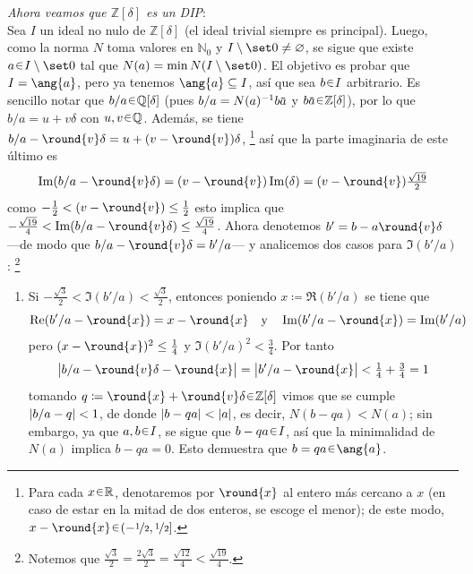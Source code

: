 \begin{sol}
\begin{enumerate}[label={\bfseries\Roman*}., wide, itemsep=1em]
\emph{Ahora veamos que $\mathbb{Z}[\delta]$ es un DIP}:\\
Sea $I$ un ideal no nulo de $\mathbb{Z}[\delta]$ (el ideal trivial siempre es principal). Luego, como la norma $N$ toma valores en $\mathbb{N}_0$ y $I\setminus\set0 \neq \varnothing$, se sigue que existe $a \en I\setminus\set0$ tal que $N(a) = \min N(I\setminus\set0)$. El objetivo es probar que $I = \ang{a}$, pero ya tenemos $\ang{a} \subseteq I$, así que sea $b \en I$ arbitrario. Es sencillo notar que $b/a \en \mathbb{Q}[\delta]$ (pues $b/a = N(a)^{-1}b\ubar{a}$ y $b\ubar{a}\en\mathbb{Z}[\delta]$), por lo que $b/a = u + v\delta$ con $u,v\en\mathbb{Q}$. Además, se tiene $b/a - \round{v}\delta = u + (v - \round{v})\delta$,%
\footnote{%
    Para cada $x \en \mathbb{R}$, denotaremos por $\round{x}$ al entero más cercano a $x$ (en caso de estar en la mitad de dos enteros, se escoge el menor); de este modo, $x - \round{x} \en (-\nicefrac12,\nicefrac12]$.
}
así que la parte imaginaria de este último es
\[
\Im(b/a - \round{v}\delta) = (v - \round{v})\Im(\delta) = (v - \round{v})\tfrac{\sqrt{19}}{2}
\]
como $-\frac12 < (v - \round{v}) \leq \frac12$ esto implica que $-\frac{\sqrt{19}}{4} < \Im(b/a - \round{v}\delta) \leq \frac{\sqrt{19}}{4}$. Ahora denotemos $b' = b - a\round{v}\delta$ ---de modo que $b/a - \round{v}\delta = b'/a$--- y analicemos dos casos para $\Im(b'/a)$:%
\footnote{%
    Notemos que $\frac{\sqrt{3}}{2} = \frac{2\sqrt{3}}{2} = \frac{\sqrt{12}}{4} < \frac{\sqrt{19}}{4}$.
}
\begin{enumerate}[label=\arabic*.]
    \item Si $-\frac{\sqrt{3}}{2} < \Im(b'/a) < \frac{\sqrt{3}}{2}$, entonces poniendo $x \coloneq \Re(b'/a)$ se tiene que 
    \[
    \Re(b'/a - \round{x}) = x - \round{x}
    \quad\text{y}\quad
    \Im(b'/a - \round{x}) = \Im(b'/a)
    \]
    pero $(x - \round{x})^2 \leq \frac14$ y $\Im(b'/a)^2 < \frac34$. Por tanto
    \[
    \abs\big{b/a - \round{v}\delta - \round{x}} = \abs\big{b'/a - \round{x}} < \tfrac14 + \tfrac34 = 1
    \]
    tomando $q \coloneq \round{x} + \round{v}\delta \en \mathbb{Z}[\delta]$ vimos que se cumple $\abs{b/a - q} < 1$, de donde $\abs{b - qa} < \abs{a}$, es decir, $N(b - qa) < N(a)$; sin embargo, ya que $a,b\en I$, se sigue que $b - qa \en I$, así que la minimalidad de $N(a)$ implica $b - qa = 0$. Esto demuestra que $b = qa \en \ang{a}$.


\end{enumerate}
\end{enumerate}
\end{sol}

